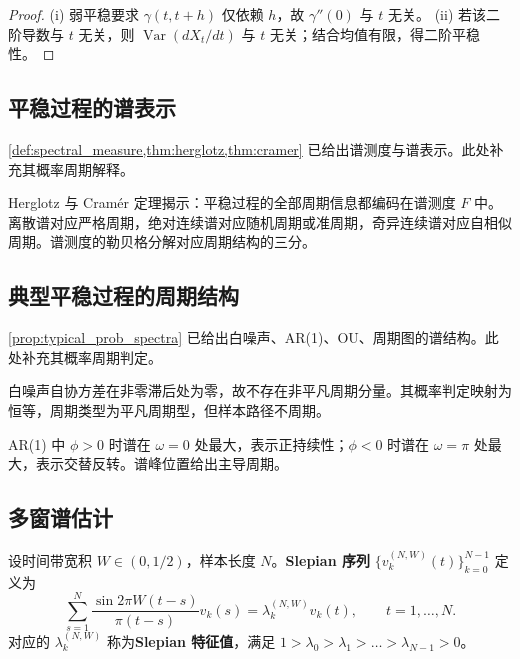 \begin{proof}
(i) 弱平稳要求 $\gamma(t,t+h)$ 仅依赖 $h$，故 $\gamma''(0)$ 与 $t$ 无关。
(ii) 若该二阶导数与 $t$ 无关，则 $\operatorname{Var}(dX_t/dt)$ 与 $t$ 无关；结合均值有限，得二阶平稳性。
\end{proof}

\subsection{平稳过程的谱表示}

\cref{def:spectral_measure,thm:herglotz,thm:cramer} 已给出谱测度与谱表示。此处补充其概率周期解释。

\begin{remark}[谱表示与周期结构的关系]\label{rem:spectral_period_relation_2}
Herglotz 与 Cramér 定理揭示：平稳过程的全部周期信息都编码在谱测度 $F$ 中。离散谱对应严格周期，绝对连续谱对应随机周期或准周期，奇异连续谱对应自相似周期。谱测度的勒贝格分解对应周期结构的三分。
\end{remark}

\subsection{典型平稳过程的周期结构}

\cref{prop:typical_prob_spectra} 已给出白噪声、AR(1)、OU、周期图的谱结构。此处补充其概率周期判定。

\begin{example}[白噪声无周期]\label{ex:white_noise_no_period}
白噪声自协方差在非零滞后处为零，故不存在非平凡周期分量。其概率判定映射为恒等，周期类型为平凡周期型，但样本路径不周期。
\end{example}

\begin{example}[AR(1) 的谱峰]\label{ex:ar1_peak}
AR(1) 中 $\phi>0$ 时谱在 $\omega=0$ 处最大，表示正持续性；$\phi<0$ 时谱在 $\omega=\pi$ 处最大，表示交替反转。谱峰位置给出主导周期。
\end{example}

\subsection{多窗谱估计}

\begin{definition}[Slepian 序列]\label{def:slepian}
设时间带宽积 $W\in(0,1/2)$，样本长度 $N$。\textbf{Slepian 序列} $\{v_k^{(N,W)}(t)\}_{k=0}^{N-1}$ 定义为
\[
\sum_{s=1}^{N}\frac{\sin2\pi W(t-s)}{\pi(t-s)}v_k(s)=\lambda_k^{(N,W)}v_k(t),\qquad t=1,\dots,N.
\]
对应的 $\lambda_k^{(N,W)}$ 称为\textbf{Slepian 特征值}，满足 $1>\lambda_0>\lambda_1>\dots>\lambda_{N-1}>0$。
\end{definition}

